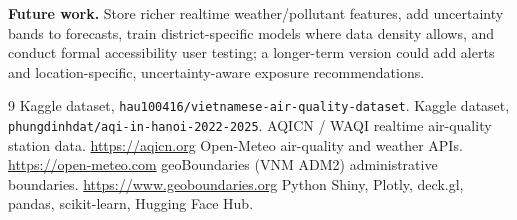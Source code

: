 \documentclass[a4paper]{article}
\begin{document}
\noindent \textbf{Future work.} Store richer realtime weather/pollutant features, add uncertainty bands to forecasts,
train district-specific models where data density allows, and conduct formal accessibility user testing;
a longer-term version could add alerts and location-specific, uncertainty-aware exposure recommendations.

\begin{thebibliography}{9}
\small
{} Kaggle dataset, \texttt{hau100416/vietnamese-air-quality-dataset}.
 Kaggle dataset, \texttt{phungdinhdat/aqi-in-hanoi-2022-2025}.
 AQICN / WAQI realtime air-quality station data. \url{https://aqicn.org}
 Open-Meteo air-quality and weather APIs. \url{https://open-meteo.com}
 geoBoundaries (VNM ADM2) administrative boundaries. \url{https://www.geoboundaries.org}
 Python Shiny, Plotly, deck.gl, pandas, scikit-learn, Hugging Face Hub.
\end{thebibliography}
\end{document}
